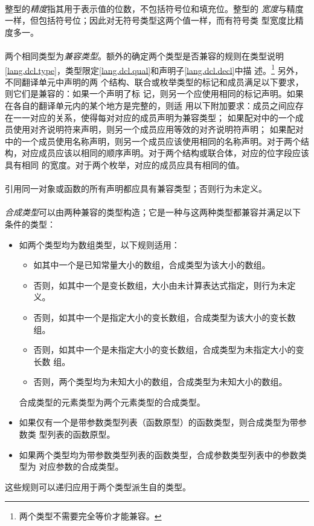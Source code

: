 \paragraph{}
整型的\textit{精度}指其用于表示值的位数，不包括符号位和填充位。整型的
\textit{宽度}与精度一样，但包括符号位；因此对无符号类型这两个值一样，而有符号类
型宽度比精度多一。

\paragraph{}
两个相同类型为\textit{兼容类型}。额外的确定两个类型是否兼容的规则在类型说明
\ref{lang.dcl.type}，类型限定\ref{lang.dcl.qual}和声明子\ref{lang.dcl.decl}中描
述。\footnote{两个类型不需要完全等价才能兼容。} 另外，不同翻译单元中声明的两
个结构、联合或枚举类型的标记和成员满足以下要求，则它们是兼容的：如果一个声明了标
记，则另一个应使用相同的标记声明。如果在各自的翻译单元内的某个地方是完整的，则适
用以下附加要求：成员之间应存在一一对应的关系，使得每对对应的成员声明为兼容类型；
如果配对中的一个成员使用对齐说明符来声明，则另一个成员应用等效的对齐说明符声明；
如果配对中的一个成员使用名称声明，则另一个成员应该使用相同的名称声明。对于两个结
构，对应成员应该以相同的顺序声明。对于两个结构或联合体，对应的位字段应该具有相同
的宽度。对于两个枚举，对应的成员应具有相同的值。

\paragraph{}
引用同一对象或函数的所有声明都应具有兼容类型；否则行为未定义。

\paragraph{}
\textit{合成类型}可以由两种兼容的类型构造；它是一种与这两种类型都兼容并满足以下
条件的类型：
\begin{itemize}
  \item{如两个类型均为数组类型，以下规则适用：
    \begin{itemize}
      \item{如其中一个是已知常量大小的数组，合成类型为该大小的数组。}
      \item{否则，如其中一个是变长数组，大小由未计算表达式指定，则行为未定义。}
      \item{否则，如其中一个是指定大小的变长数组，合成类型为该大小的变长数组。}
      \item{否则，如其中一个是未指定大小的变长数组，合成类型为未指定大小的变长数
        组。}
      \item{否则，两个类型均为未知大小的数组，合成类型为未知大小的数组。}
    \end{itemize}
    合成类型的元素类型为两个元素类型的合成类型。}
  \item{如果仅有一个是带参数类型列表（函数原型）的函数类型，则合成类型为带参数类
    型列表的函数原型。}
  \item{如果两个类型均为带参数类型列表的函数类型，合成参数类型列表中的参数类型为
    对应参数的合成类型。}
\end{itemize}
这些规则可以递归应用于两个类型派生自的类型。

